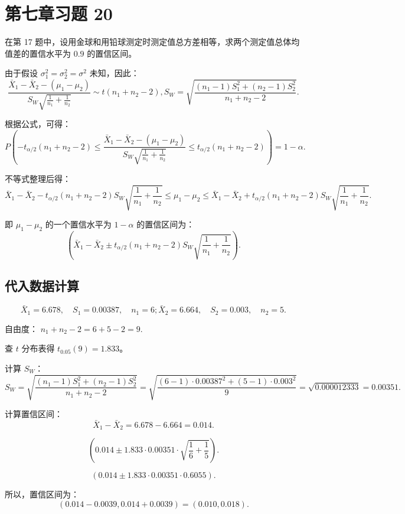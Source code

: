 \documentclass[twoside]{article}
\begin{document}
\section{第七章习题 20}

在第 17 题中，设用金球和用铅球测定时测定值总方差相等，求两个测定值总体均值差的置信水平为 $0.9$ 的置信区间。

\begin{ans}{20}{20}

    由于假设 $\sigma_1^2 = \sigma_2^2 = \sigma^2$ 未知，因此：
    \[
    \frac{\bar{X}_1 - \bar{X}_2 - (\mu_1 - \mu_2)}{S_W \sqrt{\frac{1}{n_1} + \frac{1}{n_2}}} \sim t(n_1 + n_2 - 2), S_W = \sqrt{\frac{(n_1 - 1) S_1^2 + (n_2 - 1) S_2^2}{n_1 + n_2 - 2}}.
    \]

    
    根据公式，可得：
    \[
    P \left( -t_{\alpha/2}(n_1 + n_2 - 2) \leq \frac{\bar{X}_1 - \bar{X}_2 - (\mu_1 - \mu_2)}{S_W \sqrt{\frac{1}{n_1} + \frac{1}{n_2}}} \leq t_{\alpha/2}(n_1 + n_2 - 2) \right) = 1 - \alpha.
    \]
    
    不等式整理后得：
    \[
    \bar{X}_1 - \bar{X}_2 - t_{\alpha/2}(n_1 + n_2 - 2) S_W \sqrt{\frac{1}{n_1} + \frac{1}{n_2}} \leq \mu_1 - \mu_2 \leq \bar{X}_1 - \bar{X}_2 + t_{\alpha/2}(n_1 + n_2 - 2) S_W \sqrt{\frac{1}{n_1} + \frac{1}{n_2}}.
    \]
    
    即 $\mu_1 - \mu_2$ 的一个置信水平为 $1-\alpha$ 的置信区间为：
    \[
    \left( \bar{X}_1 - \bar{X}_2 \pm t_{\alpha/2}(n_1 + n_2 - 2) S_W \sqrt{\frac{1}{n_1} + \frac{1}{n_2}} \right).
    \]
    
    \subsection*{代入数据计算}
    
    \[
    \bar{X}_1 = 6.678, \quad S_1 = 0.00387, \quad n_1 = 6; \bar{X}_2 = 6.664, \quad S_2 = 0.003, \quad n_2 = 5.
    \]
    
    自由度：
    \(
    n_1 + n_2 - 2 = 6 + 5 - 2 = 9.
    \)
    
    查 $t$ 分布表得 $t_{0.05}(9) = 1.833$。
    
    计算 $S_W$：
    \[
    S_W = \sqrt{\frac{(n_1 - 1) S_1^2 + (n_2 - 1) S_2^2}{n_1 + n_2 - 2}} = \sqrt{\frac{(6-1) \cdot 0.00387^2 + (5-1) \cdot 0.003^2}{9}} = \sqrt{0.000012333} = 0.00351.
    \]

    计算置信区间：
    \[
    \bar{X}_1 - \bar{X}_2 = 6.678 - 6.664 = 0.014.
    \]
    
    \[
    \left( 0.014 \pm 1.833 \cdot 0.00351 \cdot \sqrt{\frac{1}{6} + \frac{1}{5}} \right).
    \]
    
    \[
    \left( 0.014 \pm 1.833 \cdot 0.00351 \cdot 0.6055 \right).
    \]
    
    所以，置信区间为：
    \[
    (0.014 - 0.0039, 0.014 + 0.0039) = (0.010, 0.018).
    \]
\end{ans}
\end{document}
